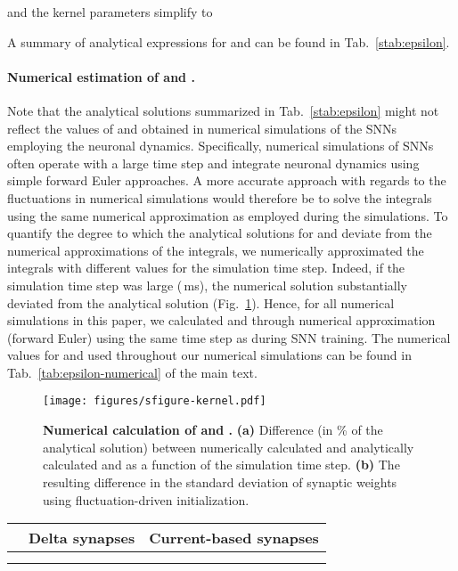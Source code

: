 \documentclass[11pt,a4paper]{article}
\begin{document}
\begin{refsection}
and the kernel parameters simplify to

A summary of analytical expressions for  and  can be found in Tab.~\ref{stab:epsilon}.

\paragraph{Numerical estimation of  and .}
Note that the analytical solutions summarized in Tab.~\ref{stab:epsilon}
might not reflect the values of  and  obtained in numerical simulations
of the \acp{SNN} employing the neuronal dynamics. 
Specifically, numerical simulations of \acp{SNN} often operate with a large
time step and integrate neuronal dynamics using simple forward Euler
approaches. 
A more accurate approach with regards to the fluctuations in numerical
simulations would therefore be to solve the integrals using the same numerical
approximation as employed during the simulations.
To quantify the degree to which the analytical solutions for  and  
deviate from the numerical approximations of the integrals, we numerically approximated the integrals
with different values for the simulation time step.
Indeed, if the simulation time step was large (\,ms), the numerical solution substantially
deviated from the analytical solution (Fig.~\ref{sfig:kernel}).
Hence, for all numerical simulations in this paper, we calculated  and  through numerical approximation (forward Euler) using the same time step as during \ac{SNN} training. The numerical values for  and  used throughout our numerical simulations can be found in Tab.~\ref{tab:epsilon-numerical} of the main text.

\begin{figure}[htb]
	\texttt{[image: figures/sfigure-kernel.pdf]}
\caption{\textbf{Numerical calculation of  and .}
	\textbf{(a)} Difference (in \% of the analytical solution) between numerically calculated and analytically calculated  and  as a function of the simulation time step. 
	\textbf{(b)} The resulting difference in the standard deviation of synaptic weights  using fluctuation-driven initialization.
}
\label{sfig:kernel}
\end{figure}

\renewcommand{\arraystretch}{1.5}
\begin{table}[htpb]
\setlength{\tabcolsep}{5pt}
\centering
\begin{tabular*}{0.6\textwidth}{@{\extracolsep{\fill}}ccc}
\toprule
 								& Delta synapses 						& Current-based synapses  \\
\midrule
					& 					& 				      \\
					& 			&


\end{tabular*}
\end{table}
\end{refsection}
\end{document}
